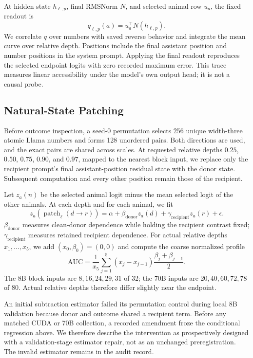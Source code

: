 \documentclass[letterpaper]{article}
\begin{document}
At hidden state $h_{\ell,p}$, final RMSNorm $N$, and selected animal row $u_a$,
the fixed readout is
\begin{equation}
q_{\ell,p}(a)=u_a^\top N(h_{\ell,p}).
\end{equation}
We correlate $q$ over numbers with saved reverse behavior and integrate the mean
curve over relative depth. Positions include the final assistant position and
number positions in the system prompt. Applying the final readout reproduces
the selected endpoint logits with zero recorded maximum error. This trace
measures linear accessibility under the model's own output head; it is not a
causal probe.

\subsection{Natural-State Patching}

Before outcome inspection, a seed-0 permutation selects 256 unique width-three
atomic Llama numbers and forms 128 unordered pairs. Both directions are used,
and the exact pairs are shared across scales. At requested relative depths
$0.25$, $0.50$, $0.75$, $0.90$, and $0.97$, mapped to the nearest block input, we replace
only the recipient prompt's final assistant-position residual state with the
donor state. Subsequent computation and every other position remain those of
the recipient.

Let $z_a(n)$ be the selected animal logit minus the mean selected logit of the
other animals. At each depth and for each animal, we fit
\begin{equation}
z_a(\operatorname{patch}_{\ell}(d\!\rightarrow\!r))=
\alpha+\beta_{\mathrm{donor}}z_a(d)
+\gamma_{\mathrm{recipient}}z_a(r)+\epsilon.
\end{equation}
$\beta_{\mathrm{donor}}$ measures clean-donor dependence while holding the
recipient contrast fixed; $\gamma_{\mathrm{recipient}}$ measures retained
recipient dependence. For actual relative depths $x_1,\ldots,x_5$, we add
$(x_0,\beta_0)=(0,0)$ and compute the coarse normalized profile
\begin{equation}
\mathrm{AUC}=\frac{1}{x_5}\sum_{j=1}^{5}
(x_j-x_{j-1})\frac{\beta_j+\beta_{j-1}}{2}.
\end{equation}
The 8B block inputs are $8,16,24,29,31$ of 32; the 70B inputs are
$20,40,60,72,78$ of 80. Actual relative depths therefore differ slightly near
the endpoint.

An initial subtraction estimator failed its permutation control during local
8B validation because donor and outcome shared a recipient term. Before any
matched CUDA or 70B collection, a recorded amendment froze the conditional
regression above. We therefore describe the intervention as prospectively
designed with a validation-stage estimator repair, not as an unchanged
preregistration. The invalid estimator remains in the audit record.
\end{document}
